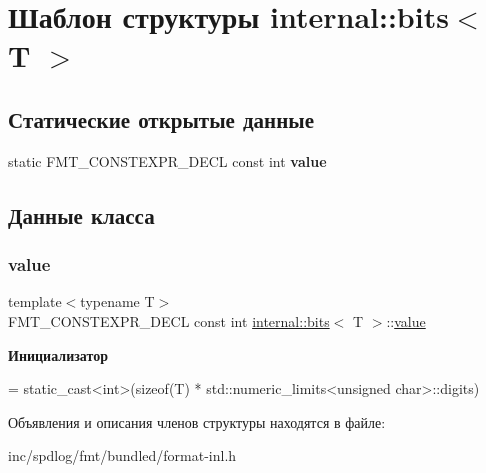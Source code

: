 \hypertarget{structinternal_1_1bits}{}\section{Шаблон структуры internal\+:\+:bits$<$ T $>$}
\label{structinternal_1_1bits}
\subsection*{Статические открытые данные}
\begin{DoxyCompactItemize}
\item 
static F\+M\+T\+\_\+\+C\+O\+N\+S\+T\+E\+X\+P\+R\+\_\+\+D\+E\+CL const int {\bfseries value}
\end{DoxyCompactItemize}


\subsection{Данные класса}
\mbox{\label{structinternal_1_1bits_ad0f3f661fb4c3afa05a7bdd11dd9fe89}} 
\subsubsection{\texorpdfstring{value}{value}}
{\footnotesize\ttfamily template$<$typename T$>$ \\
F\+M\+T\+\_\+\+C\+O\+N\+S\+T\+E\+X\+P\+R\+\_\+\+D\+E\+CL const int \hyperlink{structinternal_1_1bits}{internal\+::bits}$<$ T $>$\+::\hyperlink{classinternal_1_1value}{value}\hspace{0.3cm}{\ttfamily [static]}}

{\bfseries Инициализатор}
\begin{DoxyCode}
=
      \textcolor{keyword}{static\_cast<}\textcolor{keywordtype}{int}\textcolor{keyword}{>}(\textcolor{keyword}{sizeof}(T) * std::numeric\_limits<unsigned char>::digits)
\end{DoxyCode}


Объявления и описания членов структуры находятся в файле\+:\begin{DoxyCompactItemize}
\item 
inc/spdlog/fmt/bundled/format-\/inl.\+h\end{DoxyCompactItemize}

